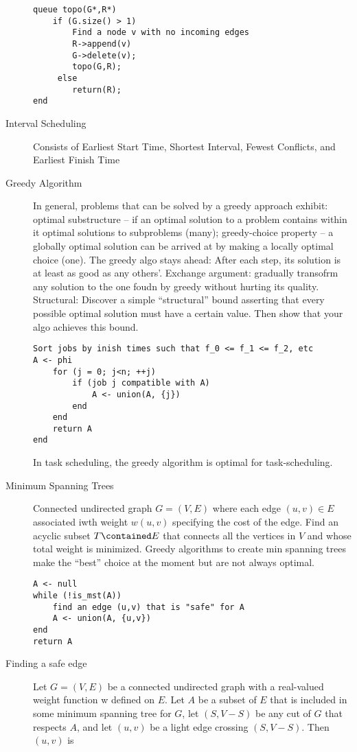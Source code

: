 \documentclass[8pt]{article}
\begin{document}
\begin{multicols}{2}
\begin{description}
\begin{verbatim}
queue topo(G*,R*)
    if (G.size() > 1)
        Find a node v with no incoming edges
        R->append(v)
        G->delete(v);
        topo(G,R);
     else
        return(R);
end
\end{verbatim}
  \item[Interval Scheduling] Consists of Earliest Start Time, Shortest
    Interval, Fewest Conflicts, and Earliest Finish Time
  \item[Greedy Algorithm] In general, problems that can be solved by a
    greedy approach exhibit: optimal substructure -- if an optimal
    solution to a problem contains within it optimal solutions to
    subproblems (many); greedy-choice property -- a globally optimal
    solution can be arrived at by making a locally optimal choice
    (one). The greedy algo stays ahead: After each step, its solution
    is at least as good as any others'. Exchange argument: gradually
    transofrm any solution to the one foudn by greedy without hurting
    its quality. Structural: Discover a simple ``structural'' bound
    asserting that every possible optimal solution must have a certain
    value. Then show that your algo achieves this bound.
\begin{verbatim}
Sort jobs by inish times such that f_0 <= f_1 <= f_2, etc
A <- phi
    for (j = 0; j<n; ++j)
        if (job j compatible with A)
            A <- union(A, {j})
        end
    end
    return A
end
\end{verbatim}
In task scheduling, the greedy algorithm is optimal for task-scheduling.
\item[Minimum Spanning Trees] Connected undirected graph $G=(V,E)$
  where each edge $(u,v) \in E$ associated iwth weight $w(u,v)$
  specifying the cost of the edge. Find an acyclic subset $T
  \contained E$ that connects all the vertices in $V$ and whose total
  weight is minimized. Greedy algorithms to create min spanning trees
  make the ``best'' choice at the moment but are not always optimal.
\begin{verbatim}
A <- null
while (!is_mst(A))
    find an edge (u,v) that is "safe" for A
    A <- union(A, {u,v})
end
return A
\end{verbatim}
\item[Finding a safe edge] Let $G = (V, E)$ be a connected undirected
  graph with a real-valued weight function w defined on $E$. Let $A$
  be a subset of $E$ that is included in some minimum spanning tree
  for $G$, let $(S, V − S)$ be any cut of $G$ that respects $A$, and
  let $(u, v)$ be a light edge crossing $(S, V − S)$. Then $(u, v)$ is

\end{description}
\end{multicols}
\end{document}
